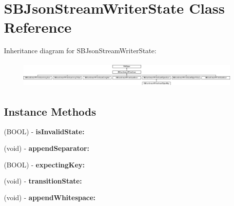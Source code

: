 \hypertarget{interface_s_b_json_stream_writer_state}{\section{S\-B\-Json\-Stream\-Writer\-State Class Reference}
\label{interface_s_b_json_stream_writer_state}
}
Inheritance diagram for S\-B\-Json\-Stream\-Writer\-State\-:\begin{figure}[H]
\begin{center}
\leavevmode
\includegraphics[height=1.367521cm]{interface_s_b_json_stream_writer_state}
\end{center}
\end{figure}
\subsection*{Instance Methods}
\begin{DoxyCompactItemize}
\item 
\hypertarget{interface_s_b_json_stream_writer_state_a9deeb84ae5298289d6b225d155ff11bb}{(B\-O\-O\-L) -\/ {\bfseries is\-Invalid\-State\-:}}\label{interface_s_b_json_stream_writer_state_a9deeb84ae5298289d6b225d155ff11bb}

\item 
\hypertarget{interface_s_b_json_stream_writer_state_ae5aaa8df1e2d280025cdc87d89c82d58}{(void) -\/ {\bfseries append\-Separator\-:}}\label{interface_s_b_json_stream_writer_state_ae5aaa8df1e2d280025cdc87d89c82d58}

\item 
\hypertarget{interface_s_b_json_stream_writer_state_a5ac84b0148db05001847af19e18941c6}{(B\-O\-O\-L) -\/ {\bfseries expecting\-Key\-:}}\label{interface_s_b_json_stream_writer_state_a5ac84b0148db05001847af19e18941c6}

\item 
\hypertarget{interface_s_b_json_stream_writer_state_acd468b65c234da4c8359a77d7dcc83a8}{(void) -\/ {\bfseries transition\-State\-:}}\label{interface_s_b_json_stream_writer_state_acd468b65c234da4c8359a77d7dcc83a8}

\item 
\hypertarget{interface_s_b_json_stream_writer_state_a3b2712761a825156a1c6f80bc2744da8}{(void) -\/ {\bfseries append\-Whitespace\-:}}\label{interface_s_b_json_stream_writer_state_a3b2712761a825156a1c6f80bc2744da8}

\end{DoxyCompactItemize}

